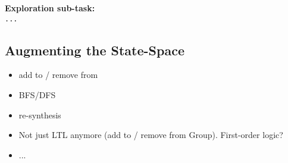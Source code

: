 \begin{algorithm}
	\textbf{Exploration sub-task:}\\
	{\small
	\texttt{...}
	}
\end{algorithm}

\subsection{Augmenting the State-Space} %

\begin{itemize}
	\item add to / remove from
	\item BFS/DFS
	\item re-synthesis
	\item Not just LTL anymore (add to / remove from Group). First-order logic?
	\item ...
\end{itemize}

